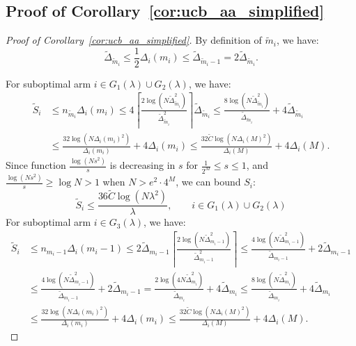 \documentclass[11pt]{article}
\begin{document}
\subsection{Proof of Corollary~\ref{cor:ucb_aa_simplified}}
\label{sec:Proof of cor:ucb_aa_simplified}
\begin{proof}[Proof of Corollary~\ref{cor:ucb_aa_simplified}]
By definition of $\tilde{m}_i$, we have:
\[  \tilde{\Delta}_{\tilde{m}_i} \leq \frac{1}{2}\Delta_i(m_i)\leq \tilde{\Delta}_{\tilde{m}_i-1}=2 \tilde{\Delta}_{\tilde{m}_i}.\]


For suboptimal arm $i\in G_1(\lambda)\cup G_2(\lambda)$, we have:
\begin{align*}
   \tilde{S}_i &\leq n_{\tilde{m}_i}\Delta_i(m_i)\leq 
4 \left\lceil \frac{2\log(N \tilde{\Delta}_{\tilde{m}_i}^2)}{\tilde{\Delta}_{\tilde{m}_i}^2} \right\rceil \tilde{\Delta}_{\tilde{m}_i} \leq \frac{8\log(N \tilde{\Delta}_{\tilde{m}_i}^2)}{\tilde{\Delta}_{\tilde{m}_i}} +4\tilde{\Delta}_{\tilde{m}_i} \\
& \le \frac{32\log(N \Delta_i(m_i)^2)}{\Delta_i(m_i)} +4\Delta_i(m_i)
\le  \frac{32 \tilde{C}\log(N \Delta_i(M)^2)}{\Delta_i(M)} +4\Delta_i(M).
\end{align*}
Since function $\frac{\log (Ns^2)}{s}$ is decreasing in $s$ for $\frac{1}{2^M}\leq s\leq 1$, and $\frac{\log (Ns^2)}{s}\geq \log N>1$ when $N>e^2\cdot4^M$, we can bound $S_i$:
$$\tilde{S}_i\leq  \frac{36\tilde{C}\log(N \lambda^2)}{\lambda} , \quad \quad  i\in G_1(\lambda)\cup G_2(\lambda)$$
For suboptimal arm $i\in G_3(\lambda)$, we have:
\begin{align*}
     \tilde{S}_i &\leq n_{m_i-1}\Delta_i(m_i-1)\leq 2\tilde{\Delta}_{m_i-1} \left\lceil \frac{2\log(N \tilde{\Delta}_{m_i-1}^2)}{\tilde{\Delta}_{m_i-1}^2} \right\rceil  \leq \frac{4\log(N \tilde{\Delta}_{m_i-1}^2)}{\tilde{\Delta}_{m_i-1}}+2\tilde{\Delta}_{m_i-1} \\
     &\le \frac{4\log(N \tilde{\Delta}_{m_i-1}^2)}{\tilde{\Delta}_{m_i-1}}+2\tilde{\Delta}_{m_i-1}
     = \frac{2\log(4N \tilde{\Delta}_{m_i}^2)}{\tilde{\Delta}_{m_i}}+4\tilde{\Delta}_{m_i} 
     \le \frac{8\log(N \tilde{\Delta}_{m_i}^2)}{\tilde{\Delta}_{m_i}}+4\tilde{\Delta}_{m_i}\\ 
     &\le \frac{32\log(N \Delta_i(m_i)^2)}{\Delta_i(m_i)} +4\Delta_i(m_i)
\le  \frac{32 \tilde{C}\log(N \Delta_i(M)^2)}{\Delta_i(M)} +4\Delta_i(M).
\end{align*}


\end{proof}
\end{document}

